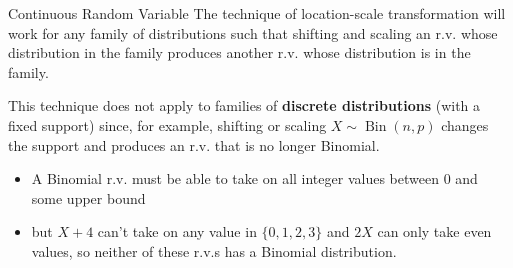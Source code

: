 \documentclass[8pt]{beamer}
\newcommand{\mybin}[2]{\operatorname{Bin}\!\left(#1,#2\right)}
\begin{document}
\begin{frame}{Continuous Random Variable}
    The technique of location-scale transformation will work for any family of distributions such that shifting and scaling an r.v. whose distribution in the family produces another r.v. whose distribution is in the family. 

\bigskip

    This technique does not apply to families of \textbf{discrete distributions} (with a fixed support) since, for example, shifting or scaling $X \sim \mybin{n}{p}$ changes the support and produces an r.v. that is no longer Binomial. 
    \begin{itemize}
        \item  A Binomial r.v. must be able to take on all integer values between $0$ and some upper bound
        \item but $X + 4$ can't take on any value in $\{0, 1, 2, 3\}$ and $2X$ can only take even values, so neither of these r.v.s has a Binomial distribution.
    \end{itemize}
\end{frame}
\end{document}
